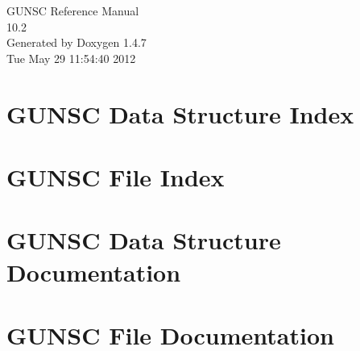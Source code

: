 \documentclass[a4paper]{book}
\begin{document}
\begin{titlepage}
\vspace*{7cm}
\begin{center}
{\Large GUNSC Reference Manual\\[1ex]\large 10.2 }\\
\vspace*{1cm}
{\large Generated by Doxygen 1.4.7}\\
\vspace*{0.5cm}
{\small Tue May 29 11:54:40 2012}\\
\end{center}
\end{titlepage}
\clearemptydoublepage
{}
\tableofcontents
\clearemptydoublepage
{}
\chapter{GUNSC Data Structure Index}

\chapter{GUNSC File Index}

\chapter{GUNSC Data Structure Documentation}

\chapter{GUNSC File Documentation}







\printindex
\end{document}
